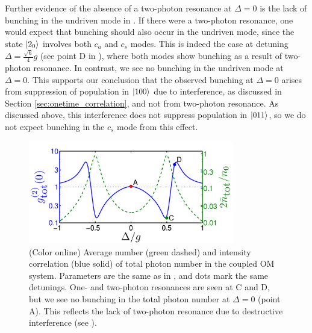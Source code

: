 Further evidence of the absence of a
two-photon resonance at $\Delta=0$ is
the lack of bunching in the undriven mode in  
.
If there were a two-photon resonance,
one would expect that bunching
should also occur in the undriven mode,
since the state $| 2_0 \rangle$ involves both $c_a$
and $c_s$ modes. 
This is indeed the case
at detuning $\Delta = \frac{\sqrt{6}}{4} g$
(see point D in ),
where
both modes show bunching as a result of
two-photon resonance.
In contrast, we see  no bunching in
the undriven mode at $\Delta = 0$. 
This supports our conclusion that the observed
bunching at $\Delta=0$ arises 
from suppression of 
population in $| 100 \rangle$ due to interference,
as discussed in Section \ref{sec:onetime_correlation},
and not from two-photon resonance.
As discussed above, this interference
does not suppress population in 
$| 011 \rangle$,
so we do not expect
bunching in the $c_s$ mode from this effect.
\begin{figure} 
\centering
  \includegraphics[width=0.8\textwidth]{./figs_Komar2013/fig3.pdf}
  \caption{
  \label{fig:populations}(Color online)
  Average number (green dashed) and intensity correlation
  (blue solid)
  of total photon number in the coupled OM system.
  Parameters are the same as in ,
  and dots mark the same detunings.
  One- and two-photon resonances are
  seen at C and D,
  but we see no bunching in the
  total photon number at 
  $\Delta = 0$ (point A).
  This reflects the lack
  of two-photon resonance due to 
  destructive interference (see ).  } 
\end{figure}

